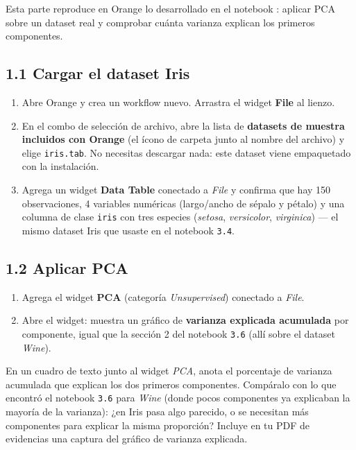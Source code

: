 \documentclass[11pt,letterpaper]{article}
\begin{document}
Esta parte reproduce en Orange lo desarrollado en el notebook \texttt{}: aplicar PCA sobre un dataset real y comprobar cuánta varianza explican los primeros componentes.

\subsection{1.1 Cargar el dataset Iris}

\begin{enumerate}[leftmargin=1.2cm]
  \item Abre Orange y crea un workflow nuevo. Arrastra el widget \textbf{File} al lienzo.
  \item En el combo de selección de archivo, abre la lista de \textbf{datasets de muestra incluidos con Orange} (el ícono de carpeta junto al nombre del archivo) y elige \texttt{iris.tab}. No necesitas descargar nada: este dataset viene empaquetado con la instalación.
  \item Agrega un widget \textbf{Data Table} conectado a \textit{File} y confirma que hay 150 observaciones, 4 variables numéricas (largo/ancho de sépalo y pétalo) y una columna de clase \texttt{iris} con tres especies (\textit{setosa}, \textit{versicolor}, \textit{virginica}) --- el mismo dataset Iris que usaste en el notebook \texttt{3.4}.
\end{enumerate}

\subsection{1.2 Aplicar PCA}

\begin{enumerate}[leftmargin=1.2cm]
  \item Agrega el widget \textbf{PCA} (categoría \textit{Unsupervised}) conectado a \textit{File}.
  \item Abre el widget: muestra un gráfico de \textbf{varianza explicada acumulada} por componente, igual que la sección 2 del notebook \texttt{3.6} (allí sobre el dataset \textit{Wine}).
\end{enumerate}

\begin{actividad}
En un cuadro de texto junto al widget \textit{PCA}, anota el porcentaje de varianza acumulada que explican los dos primeros componentes. Compáralo con lo que encontró el notebook \texttt{3.6} para \textit{Wine} (donde pocos componentes ya explicaban la mayoría de la varianza): ¿en Iris pasa algo parecido, o se necesitan más componentes para explicar la misma proporción? Incluye en tu PDF de evidencias una captura del gráfico de varianza explicada.
\end{actividad}
\end{document}
